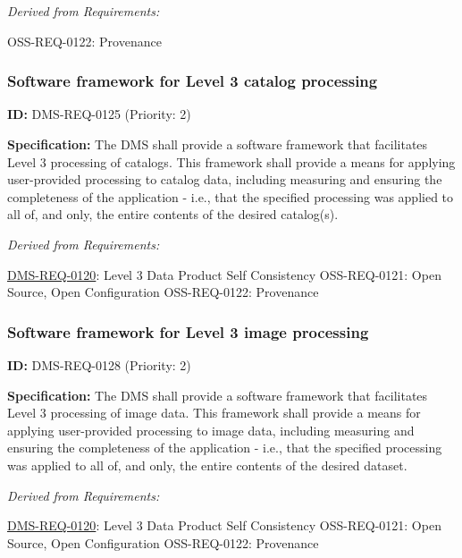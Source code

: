 \documentclass[SE,toc,lsstdraft]{lsstdoc}
\begin{document}
\emph{Derived from Requirements:}

OSS-REQ-0122:
Provenance \newline

\subsubsection{Software framework for Level 3 catalog processing}

\label{DMS-REQ-0125}
\textbf{ID:} DMS-REQ-0125 (Priority: 2)

\textbf{Specification:} The DMS shall provide a software framework that facilitates Level 3 processing of catalogs.  This framework shall provide a means for applying user-provided processing to catalog data, including measuring and ensuring the completeness of the application - i.e., that the specified processing was applied to all of, and only, the entire contents of the desired catalog(s).

\emph{Derived from Requirements:}

\hyperref[DMS-REQ-0120]{DMS-REQ-0120}:
Level 3 Data Product Self Consistency \newline
OSS-REQ-0121:
Open Source, Open Configuration \newline
OSS-REQ-0122:
Provenance \newline

\subsubsection{Software framework for Level 3 image processing}

\label{DMS-REQ-0128}
\textbf{ID:} DMS-REQ-0128 (Priority: 2)

\textbf{Specification:} The DMS shall provide a software framework that facilitates Level 3 processing of image data.  This framework shall provide a means for applying user-provided processing to image data, including measuring and ensuring the completeness of the application - i.e., that the specified processing was applied to all of, and only, the entire contents of the desired dataset.

\emph{Derived from Requirements:}

\hyperref[DMS-REQ-0120]{DMS-REQ-0120}:
Level 3 Data Product Self Consistency \newline
OSS-REQ-0121:
Open Source, Open Configuration \newline
OSS-REQ-0122:
Provenance \newline
\end{document}
